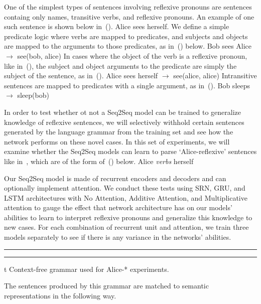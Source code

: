 One of the simplest types of sentences involving reflexive pronouns are 
sentences containg only names, transitive verbs, and reflexive pronouns. An
example of one such sentence is shown below in~(\nextx).
	Alice sees herself.
\xe
We define a simple predicate logic where verbs are mapped to predicates, and
subjects and objects are mapped to the arguments to those predicates, as 
in~(\nextx) below.
\ex
	Bob sees Alice $\to$ see(bob, alice)
\xe
In cases where the object of the verb is a reflexive pronoun, like in~(\blastx), the subject and
object arguments to the predicate are simply the subject of the sentence, as
in~(\nextx).
\ex
	Alice sees herself $\to$ see(alice, alice)
\xe
Intransitive sentences are mapped to predicates with a single argument, as 
in~(\nextx).
\ex
	Bob sleeps $\to$ sleep(bob)
\xe

In order to test whether ot not a Seq2Seq model can be trained to generalize 
knowledge of reflexive sentences, we will selectively withhold certain 
sentences generated by the language grammar from the training set and see how
the network performs on these novel cases. In this set of experiments, we will
examine whether the Seq2Seq models can learn to parse `Alice-reflexive' 
sentences like in~, which are of the form of~(\nextx) below.
\ex
	Alice {\it verbs} herself
\xe

Our Seq2Seq model is made of recurrent encoders and decoders and can 
optionally implement attention. We conduct these tests using SRN, GRU, and LSTM
architectures with No Attention, Additive Attention, and Multiplicative 
attention to gauge the effect that network architecture has on our models' 
abilities to learn to interpret reflexive pronouns and generalize this 
knowledge to new cases. For each combination of recurrent unit and attention,
we train three models separately to see if there is any variance in the 
networks' abilities.

\ex
\hrule width 5in
\smallskip
{}
\smallskip
\hrule width 5in
\xe
\caption/t Context-free grammar used for Alice-* experiments.

The sentences produced by this grammar are matched to semantic representations
in the following way.

